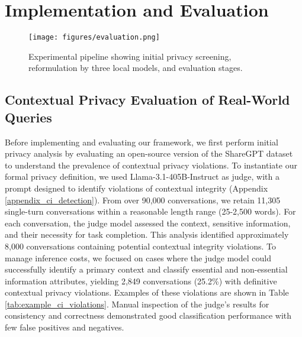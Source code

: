 \section{Implementation and Evaluation}



\begin{figure}[htbp]
\centering
    \texttt{[image: figures/evaluation.png]}
    \caption{Experimental pipeline showing initial privacy screening, reformulation by three local models, and evaluation stages.}
    \label{fig:experiment}
\end{figure}

\subsection{Contextual Privacy Evaluation of Real-World Queries}
\label{sec:sharegot_privacy_evaluation}
Before implementing and evaluating our framework, we first perform initial privacy analysis by evaluating 
an open-source version of the ShareGPT dataset~\citep{vicuna2023} to understand the prevalence of contextual privacy violations. To instantiate our formal privacy definition, we used Llama-3.1-405B-Instruct \cite{grattafiori2024llama3herdmodels} as judge, with a prompt designed to identify violations of contextual integrity (Appendix \ref{appendix_ci_detection}). From over 90,000 conversations, we retain 11,305 single-turn conversations within a reasonable length range (25-2,500 words). For each conversation, the judge model assessed the context, sensitive information, and their necessity for task completion. This analysis identified approximately 8,000 conversations containing potential contextual integrity violations. To manage inference costs, we focused on cases where the judge model could successfully identify a primary context and classify essential and non-essential information attributes, yielding 2,849 conversations (25.2\%) with definitive contextual privacy violations. Examples of these violations are shown in Table \ref{tab:example_ci_violations}. Manual inspection of the judge's results for consistency and correctness demonstrated good classification performance with few false positives and negatives.

